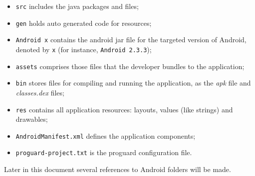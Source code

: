 \begin{itemize}
\item \texttt{src} includes the java packages and files;
\item \texttt{gen} holds auto generated code for resources;
\item \texttt{Android x} contains the android jar file for the targeted version of Android, denoted by \texttt{x} (for instance, \texttt{Android 2.3.3});
\item \texttt{assets} comprises those files that the developer bundles to the application;
\item \texttt{bin} stores files for compiling and running the application, as the \textit{apk} file and \textit{classes.dex} files;
\item \texttt{res} contains all application resources: layouts, values (like strings) and drawables;
\item \texttt{AndroidManifest.xml} defines the application components;
\item \texttt{proguard-project.txt} is the proguard configuration file.
\end{itemize}

Later in this document several references to Android folders will be made.